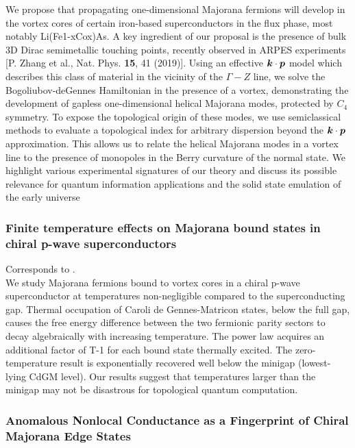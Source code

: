 We propose that propagating one-dimensional Majorana fermions will develop in the vortex cores of certain iron-based superconductors in the flux phase, most notably Li(Fe1-xCox)As. A key ingredient of our proposal is the presence of bulk 3D Dirac semimetallic touching points, recently observed in ARPES experiments [P. Zhang et al., Nat. Phys. \textbf{15}, 41 (2019)]. Using an effective $\boldsymbol{k}\cdot \boldsymbol{p}$ model which describes this class of material in the vicinity of the $\Gamma-Z$ line, we solve the Bogoliubov-deGennes Hamiltonian in the presence of a vortex, demonstrating the development of gapless one-dimensional helical Majorana modes, protected by $C_4$ symmetry. To expose the topological origin of these modes, we use semiclassical methods to evaluate a topological index for arbitrary dispersion beyond the $\boldsymbol{k}\cdot \boldsymbol{p}$ approximation. This allows us to relate the helical Majorana modes in a vortex line to the presence of monopoles in the Berry curvature of the normal state. We highlight various experimental signatures of our theory and discuss its possible relevance for quantum information applications and the solid state emulation of the early universe

\subsubsection{Finite temperature effects on Majorana bound states in chiral p-wave superconductors}

Corresponds to \cite{2019Schou}.\\

We study Majorana fermions bound to vortex cores in a chiral p-wave superconductor at temperatures non-negligible compared to the superconducting gap. Thermal occupation of Caroli de Gennes-Matricon states, below the full gap, causes the free energy difference between the two fermionic parity sectors to decay algebraically with increasing temperature. The power law acquires an additional factor of T-1 for each bound state thermally excited. The zero-temperature result is exponentially recovered well below the minigap (lowest-lying CdGM level). Our results suggest that temperatures larger than the minigap may not be disastrous for topological quantum computation. 

\subsubsection{Anomalous Nonlocal Conductance as a Fingerprint of Chiral Majorana Edge States}

